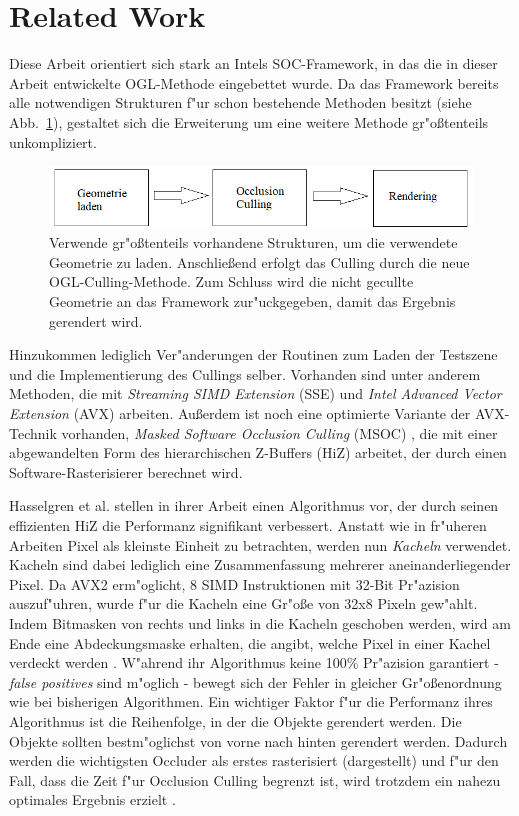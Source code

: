 \documentclass[journal]{vgtc}
\begin{document}
\section{Related Work}
Diese Arbeit orientiert sich stark an Intels SOC-Framework, in das die in dieser Arbeit entwickelte OGL-Methode eingebettet wurde. Da das Framework bereits alle notwendigen Strukturen f"ur schon bestehende Methoden besitzt (siehe Abb.\ \ref{fig:ablaufframework}), gestaltet sich die Erweiterung um eine weitere Methode gr"o{\ss}tenteils unkompliziert. 
\begin{figure}%
\includegraphics[width=\columnwidth]{images/AblaufFramework.png}%
\caption{Verwende gr"o{\ss}tenteils vorhandene Strukturen, um die verwendete Geometrie zu laden. Anschlie{\ss}end erfolgt das Culling durch die neue OGL-Culling-Methode. Zum Schluss wird die nicht gecullte Geometrie an das Framework zur"uckgegeben, damit das Ergebnis gerendert wird.}%
\label{fig:ablaufframework}%
\end{figure}
Hinzukommen lediglich Ver"anderungen der Routinen zum Laden der Testszene und die Implementierung des Cullings selber. Vorhanden sind unter anderem Methoden, die mit \textit{Streaming SIMD Extension} (SSE) und \textit{Intel Advanced Vector Extension} (AVX) arbeiten. Au{\ss}erdem ist noch eine optimierte Variante der AVX-Technik vorhanden, \textit{Masked Software Occlusion Culling} (MSOC) \cite{MSOC}, die mit einer abgewandelten Form des hierarchischen Z-Buffers (HiZ) \cite{HiZ} arbeitet, der durch einen Software-Rasterisierer berechnet wird.

Hasselgren et al. \cite{MSOC} stellen in ihrer Arbeit einen Algorithmus vor, der durch seinen effizienten HiZ die Performanz signifikant verbessert. Anstatt wie in fr"uheren Arbeiten Pixel als kleinste Einheit zu betrachten, werden nun \textit{Kacheln} verwendet. Kacheln sind dabei lediglich eine Zusammenfassung mehrerer aneinanderliegender Pixel. Da AVX2 erm"oglicht, 8 SIMD Instruktionen mit 32-Bit Pr"azision auszuf"uhren, wurde f"ur die Kacheln eine Gr"o\ss{}e von 32x8 Pixeln gew"ahlt. Indem Bitmasken von rechts und links in die Kacheln geschoben werden, wird am Ende eine Abdeckungsmaske erhalten, die angibt, welche Pixel in einer Kachel verdeckt werden \cite{MSOC}.
W"ahrend ihr Algorithmus keine 100\% Pr"azision garantiert - \textit{false positives} sind m"oglich - bewegt sich der Fehler in gleicher Gr"o\ss{}enordnung wie bei bisherigen Algorithmen. Ein wichtiger Faktor f"ur die Performanz ihres Algorithmus ist die Reihenfolge, in der die Objekte gerendert werden. Die Objekte sollten bestm"oglichst von vorne nach hinten gerendert werden. Dadurch werden die wichtigsten Occluder als erstes rasterisiert (dargestellt) und f"ur den Fall, dass die Zeit f"ur Occlusion Culling begrenzt ist, wird trotzdem ein nahezu optimales Ergebnis erzielt \cite{MSOC}.\\
\end{document}
